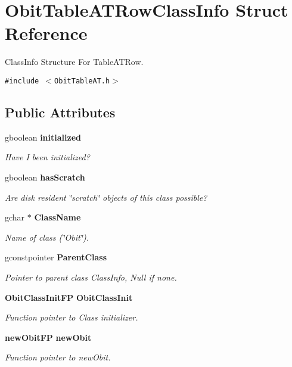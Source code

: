 \section{Obit\-Table\-ATRow\-Class\-Info Struct Reference}
\label{structObitTableATRowClassInfo}
Class\-Info Structure For Table\-ATRow.  


{\tt \#include $<$Obit\-Table\-AT.h$>$}

\subsection*{Public Attributes}
\begin{CompactItemize}
\item 
gboolean {\bf initialized}
\begin{CompactList}\small\item\em Have I been initialized? \item\end{CompactList}\item 
gboolean {\bf has\-Scratch}
\begin{CompactList}\small\item\em Are disk resident \char`\"{}scratch\char`\"{} objects of this class possible? \item\end{CompactList}\item 
gchar $\ast$ {\bf Class\-Name}
\begin{CompactList}\small\item\em Name of class (\char`\"{}Obit\char`\"{}). \item\end{CompactList}\item 
gconstpointer {\bf Parent\-Class}
\begin{CompactList}\small\item\em Pointer to parent class Class\-Info, Null if none. \item\end{CompactList}\item 
{\bf Obit\-Class\-Init\-FP} {\bf Obit\-Class\-Init}
\begin{CompactList}\small\item\em Function pointer to Class initializer. \item\end{CompactList}\item 
{\bf new\-Obit\-FP} {\bf new\-Obit}
\begin{CompactList}\small\item\em Function pointer to new\-Obit. \item\end{CompactList}\item 

\end{CompactItemize}
